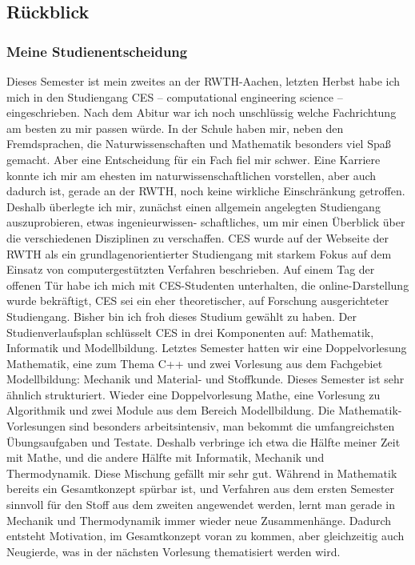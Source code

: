 \documentclass[12pt]{article}
\begin{document}
\begin{large}
\subsection*{Rückblick}
\subsubsection*{Meine Studienentscheidung}
Dieses Semester ist mein zweites an der RWTH-Aachen, letzten Herbst habe ich mich in den Studiengang CES – computational engineering science – eingeschrieben. Nach dem Abitur war ich noch unschlüssig welche Fachrichtung am besten zu mir passen würde. In der Schule haben mir, neben den Fremdsprachen, die Naturwissenschaften und Mathematik besonders viel Spaß gemacht. Aber eine Entscheidung für ein Fach fiel mir schwer. Eine Karriere konnte ich mir am ehesten im naturwissenschaftlichen vorstellen, aber auch dadurch ist, gerade an der RWTH, noch keine wirkliche Einschränkung getroffen. Deshalb überlegte ich mir, zunächst einen allgemein angelegten Studiengang auszuprobieren, etwas ingenieurwissen- schaftliches, um mir einen Überblick über die verschiedenen Disziplinen zu verschaffen. 
\newline
\newline
CES wurde auf der Webseite der RWTH als ein grundlagenorientierter Studiengang mit starkem Fokus auf dem Einsatz von computergestützten Verfahren beschrieben. Auf einem Tag der offenen Tür habe ich mich mit CES-Studenten unterhalten, die online-Darstellung wurde bekräftigt, CES sei ein eher theoretischer, auf Forschung ausgerichteter Studiengang. Bisher bin ich froh dieses Studium gewählt zu haben. Der Studienverlaufsplan schlüsselt CES in drei Komponenten auf: Mathematik, Informatik und Modellbildung. Letztes Semester hatten wir eine Doppelvorlesung Mathematik, eine zum Thema C++ und zwei Vorlesung aus dem Fachgebiet Modellbildung: Mechanik und Material- und Stoffkunde. Dieses Semester ist sehr ähnlich strukturiert. Wieder eine Doppelvorlesung Mathe, eine Vorlesung zu Algorithmik und zwei Module aus dem Bereich Modellbildung.
\newline
\newline
Die Mathematik-Vorlesungen sind besonders arbeitsintensiv, man bekommt die umfangreichsten Übungsaufgaben und Testate. Deshalb verbringe ich etwa die Hälfte meiner Zeit mit Mathe, und die andere Hälfte mit Informatik, Mechanik und Thermodynamik. Diese Mischung gefällt mir sehr gut. Während in Mathematik bereits ein Gesamtkonzept spürbar ist, und Verfahren aus dem ersten Semester sinnvoll für den Stoff aus dem zweiten angewendet werden, lernt man gerade in Mechanik und Thermodynamik immer wieder neue Zusammenhänge. Dadurch entsteht Motivation, im Gesamtkonzept voran zu kommen, aber gleichzeitig auch Neugierde, was in der nächsten Vorlesung thematisiert werden wird.

\end{large}
\end{document}
